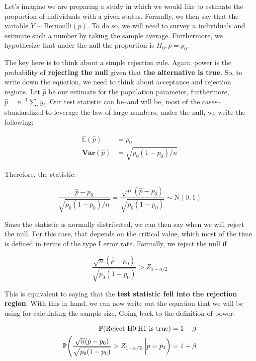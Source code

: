 \documentclass[
]{book}
\begin{document}
Let's imagine we are preparing a study in which we would like to estimate the proportion of individuals with a given status. Formally, we then say that the variable \(Y\sim\mbox{Bernoulli}(p)\). To do so, we will need to survey \(n\) individuals and estimate such a number by taking the sample average. Furthermore, we hypothesize that under the null the proportion is \(H_0: p = p_0\).

The key here is to think about a simple rejection rule. Again, power is the probability of \textbf{rejecting the null} given that \textbf{the alternative is true}. So, to write down the equation, we need to think about acceptance and rejection regions. Let \(\hat p\) be our estimate for the population parameter, furthermore, \(\hat p = n^{-1}\sum_i y_i\). Our test statistic can be--and will be, most of the cases--standardized to leverage the law of large numbers; under the null, we write the following:

\begin{align*}
\mathbb{E}(\hat p) & = p_0 \\
\mathbf{Var}(\hat p) & = \sqrt{p_0(1-p_0)/n}
\end{align*}

Therefore, the statistic:

\begin{equation*}
\frac{\hat p - p_0}{\sqrt{p_0(1-p_0)/n}} = \frac{\sqrt{n}(\hat p - p_0)}{\sqrt{p_0(1-p_0)}} \sim \mbox{N}(0, 1)
\end{equation*}

Since the statistic is normally distributed, we can then say when we will reject the null. For this case, that depends on the critical value, which most of the time is defined in terms of the type I error rate. Formally, we reject the null if

\begin{equation*}
\frac{\sqrt{n}(\hat p - p_0)}{\sqrt{p_0(1-p_0)}} > Z_{1-\alpha/2}
\end{equation*}

This is equivalent to saying that the \textbf{test statistic fell into the rejection region}. With this in hand, we can now write out the equation that we will be using for calculating the sample size. Going back to the definition of power:

\begin{align*}
\mathbb{P}{(\mbox{Reject H0}|\mbox{H1 is true})} & = 1-\beta \\
\mathbb{P}{\left(\frac{\sqrt{n}(\hat p - p_0)}{\sqrt{p_0(1-p_0)}} > Z_{1-\alpha/2}\right.\left|\vphantom{\frac{1}{2}}p = p_1\right)} & = 1 - \beta
\end{align*}
\end{document}
